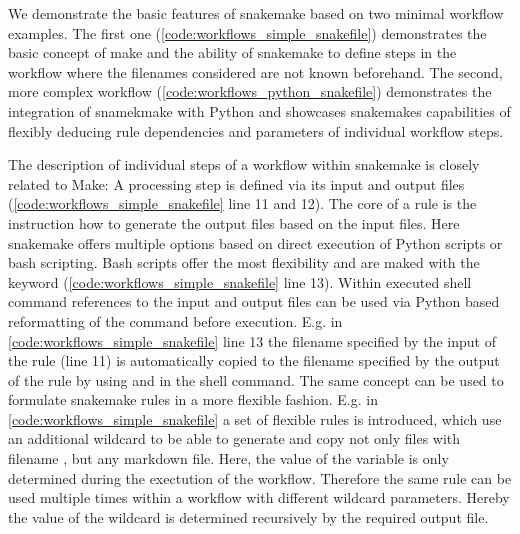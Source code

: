 We demonstrate the basic features of snakemake based on two minimal workflow examples. The first one (\cref{code:workflows_simple_snakefile}) demonstrates the basic concept of make and the ability of snakemake to define steps in the workflow where the filenames considered are not known beforehand. The second, more complex workflow (\cref{code:workflows_python_snakefile}) demonstrates the integration of snamekmake with Python and showcases snakemakes capabilities of flexibly deducing rule dependencies and parameters of individual workflow steps.

The description of individual steps of a workflow within snakemake is closely related to Make: A processing step is defined via its input and output files (\cref{code:workflows_simple_snakefile} line 11 and 12). The core of a rule is the instruction how to generate the output files based on the input files. Here snakemake offers multiple options based on direct execution of Python scripts or bash scripting. Bash scripts offer the most flexibility and are maked with the  keyword (\cref{code:workflows_simple_snakefile} line 13). Within executed shell command references to the input and output files can be used via Python based reformatting of the command before execution. E.g. in \cref{code:workflows_simple_snakefile} line 13 the filename specified by the input of the rule  (line 11) is automatically copied to the filename specified by the output of the rule by using  and  in the shell command. The same concept can be used to formulate snakemake rules in a more flexible fashion. E.g. in \cref{code:workflows_simple_snakefile} a set of flexible rules is introduced, which use an additional wildcard  to be able to generate and copy not only files with filename , but any markdown file. Here, the value of the variable  is only determined during the exectution of the workflow. Therefore the same rule can be used multiple times within a workflow with different wildcard parameters. Hereby the value of the wildcard is determined recursively by the required output file.

